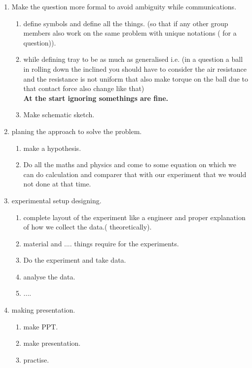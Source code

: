 \documentclass[12pt]{article}
\begin{document}
\maketitle

\begin{enumerate}
	\item Make the question more formal to avoid ambiguity while communications.
		\begin{enumerate}
			\item define symbols and define all the things. 
				(so that if any other group members also work on the same problem with unique notations ( for a question)).
			\item while defining tray to be as much as generalised i.e. (in a question a ball in rolling down the inclined you should have to consider the air resistance and the resistance is not uniform that also make torque on the ball due to that contact force also change like that)
				\\
				\textbf{At the start ignoring somethings are fine.}
			\item 
				Make schematic sketch.
			
		\end{enumerate}
	\item planing the approach to solve the problem.
		\begin{enumerate}
			\item make a hypothesis.
			\item Do all the maths and physics and come to some equation on which we can do calculation and comparer that with our experiment that we would not done at that time. 
		\end{enumerate}
	\item experimental setup designing.
		\begin{enumerate}
			\item complete layout of the experiment like a engineer and proper explanation of how we collect the data.( theoretically).
			\item material and .... things require for the experiments.
			\item Do the experiment and take data.
			\item analyse the data.
			\item ....
		\end{enumerate}
	\item making presentation. 
		\begin{enumerate}
			\item make PPT.
			\item make presentation.
			\item practise.
		\end{enumerate}
		


		

\end{enumerate}
\end{document}
